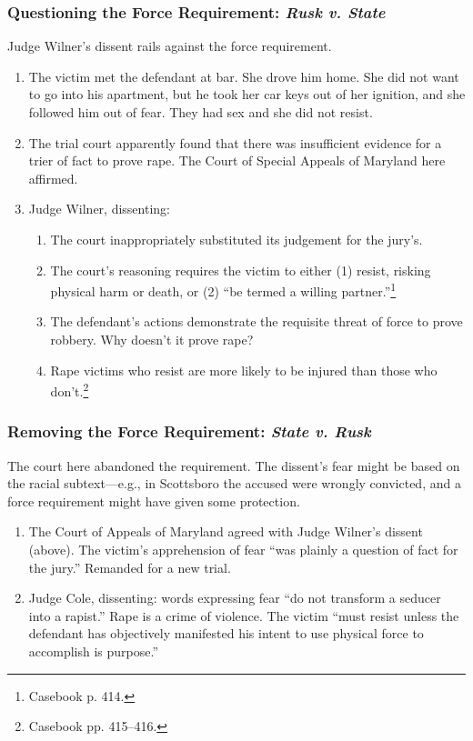 \subsubsection{Questioning the Force Requirement: \emph{Rusk v. State}}

Judge Wilner's dissent rails against the force requirement.

\begin{enumerate}
    \item The victim met the defendant at bar. She drove him home. She did not 
    want to go into his apartment, but he took her car keys out of her 
    ignition, and she followed him out of fear. They had sex and she did not 
    resist.
    \item The trial court apparently found that there was insufficient 
    evidence for a trier of fact to prove rape. The Court of Special Appeals 
    of Maryland here affirmed.
    \item Judge Wilner, dissenting:
    \begin{enumerate}
        \item The court inappropriately substituted its judgement for the 
        jury's.
        \item The court's reasoning requires the victim to either (1) resist, 
        risking physical harm or death, or (2) ``be termed a willing 
        partner.''\footnote{Casebook p. 414.}
        \item The defendant's actions demonstrate the requisite threat of 
        force to prove robbery. Why doesn't it prove rape?
        \item Rape victims who resist are more likely to be injured than those 
        who don't.\footnote{Casebook pp. 415--416.}
    \end{enumerate}
\end{enumerate}

\subsubsection{Removing the Force Requirement: \emph{State v. Rusk}}

The court here abandoned the requirement. The dissent's fear might be based on 
the racial subtext---e.g., in Scottsboro the accused were wrongly convicted, 
and a force requirement might have given some protection.

\begin{enumerate}
    \item The Court of Appeals of Maryland agreed with Judge Wilner's dissent 
    (above). The victim's apprehension of fear ``was plainly a question of 
    fact for the jury.'' Remanded for a new trial.
    \item Judge Cole, dissenting: words expressing fear ``do not transform a 
    seducer into a rapist.'' Rape is a crime of violence. The victim ``must 
    resist unless the defendant has objectively manifested his intent to use 
    physical force to accomplish is purpose.''
\end{enumerate}

